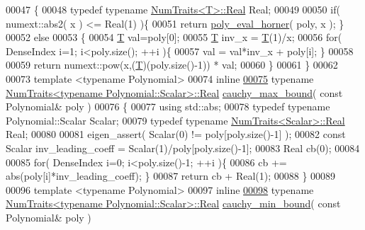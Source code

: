 \begin{DoxyCode}
00047 \{
00048   \textcolor{keyword}{typedef} \textcolor{keyword}{typename} \hyperlink{group___sparse_core___module}{NumTraits<T>::Real} Real;
00049 
00050   \textcolor{keywordflow}{if}( numext::abs2( x ) <= Real(1) )\{
00051     \textcolor{keywordflow}{return} \hyperlink{namespace_eigen_aadbf059bc28ce1cf94c57c1454633d40}{poly\_eval\_horner}( poly, x ); \}
00052   \textcolor{keywordflow}{else}
00053   \{
00054     \hyperlink{group___sparse_core___module}{T} val=poly[0];
00055     \hyperlink{group___sparse_core___module}{T} inv\_x = \hyperlink{group___sparse_core___module}{T}(1)/x;
00056     \textcolor{keywordflow}{for}( DenseIndex i=1; i<poly.size(); ++i )\{
00057       val = val*inv\_x + poly[i]; \}
00058 
00059     \textcolor{keywordflow}{return} numext::pow(x,(\hyperlink{group___sparse_core___module}{T})(poly.size()-1)) * val;
00060   \}
00061 \}
00062 
00073 \textcolor{keyword}{template} <\textcolor{keyword}{typename} Polynomial>
00074 \textcolor{keyword}{inline}
\hyperlink{namespace_eigen_ac90ec4513aa09bb8ad54daa209322d03}{00075} \textcolor{keyword}{typename} \hyperlink{group___sparse_core___module}{NumTraits<typename Polynomial::Scalar>::Real} 
      \hyperlink{namespace_eigen_ac90ec4513aa09bb8ad54daa209322d03}{cauchy\_max\_bound}( \textcolor{keyword}{const} Polynomial& poly )
00076 \{
00077   \textcolor{keyword}{using} std::abs;
00078   \textcolor{keyword}{typedef} \textcolor{keyword}{typename} Polynomial::Scalar Scalar;
00079   \textcolor{keyword}{typedef} \textcolor{keyword}{typename} \hyperlink{group___core___module_struct_eigen_1_1_num_traits}{NumTraits<Scalar>::Real} Real;
00080 
00081   eigen\_assert( Scalar(0) != poly[poly.size()-1] );
00082   \textcolor{keyword}{const} Scalar inv\_leading\_coeff = Scalar(1)/poly[poly.size()-1];
00083   Real cb(0);
00084 
00085   \textcolor{keywordflow}{for}( DenseIndex i=0; i<poly.size()-1; ++i )\{
00086     cb += abs(poly[i]*inv\_leading\_coeff); \}
00087   \textcolor{keywordflow}{return} cb + Real(1);
00088 \}
00089 
00096 \textcolor{keyword}{template} <\textcolor{keyword}{typename} Polynomial>
00097 \textcolor{keyword}{inline}
\hyperlink{namespace_eigen_a43f0af310d5cc131eb5e806f241af951}{00098} \textcolor{keyword}{typename} \hyperlink{group___sparse_core___module}{NumTraits<typename Polynomial::Scalar>::Real} 
      \hyperlink{namespace_eigen_a43f0af310d5cc131eb5e806f241af951}{cauchy\_min\_bound}( \textcolor{keyword}{const} Polynomial& poly )

\end{DoxyCode}
